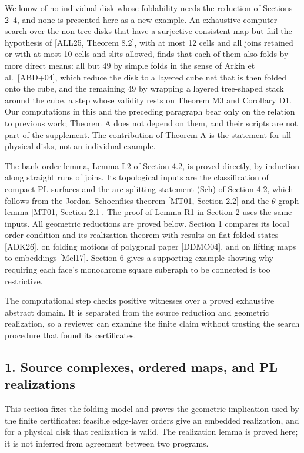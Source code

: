 \documentclass[
  11pt,
]{article}
\newcounter{none} %
\begin{document}
We know of no individual disk whose foldability needs the reduction of
Sections 2--4, and none is presented here as a new example. An
exhaustive computer search over the non-tree disks that have a
surjective consistent map but fail the hypothesis of {[}ALL25, Theorem
8.2{]}, with at most 12 cells and all joins retained or with at most 10
cells and slits allowed, finds that each of them also folds by more
direct means: all but 49 by simple folds in the sense of Arkin et
al.~{[}ABD+04{]}, which reduce the disk to a layered cube net that is
then folded onto the cube, and the remaining 49 by wrapping a layered
tree-shaped stack around the cube, a step whose validity rests on
Theorem M3 and Corollary D1. Our computations in this and the preceding
paragraph bear only on the relation to previous work; Theorem A does not
depend on them, and their scripts are not part of the supplement. The
contribution of Theorem A is the statement for all physical disks, not
an individual example.

The bank-order lemma, Lemma L2 of Section 4.2, is proved directly, by
induction along straight runs of joins. Its topological inputs are the
classification of compact PL surfaces and the arc-splitting statement
(Sch) of Section 4.2, which follows from the Jordan--Schoenflies theorem
{[}MT01, Section 2.2{]} and the \(\theta\)-graph lemma {[}MT01, Section
2.1{]}. The proof of Lemma R1 in Section 2 uses the same inputs. All
geometric reductions are proved below. Section 1 compares its local
order condition and its realization theorem with results on flat folded
states {[}ADK26{]}, on folding motions of polygonal paper {[}DDMO04{]},
and on lifting maps to embeddings {[}Mel17{]}. Section 6 gives a
supporting example showing why requiring each face's monochrome square
subgraph to be connected is too restrictive.

The computational step checks positive witnesses over a proved
exhaustive abstract domain. It is separated from the source reduction
and geometric realization, so a reviewer can examine the finite claim
without trusting the search procedure that found its certificates.

\subsection{1. Source complexes, ordered maps, and PL
realizations}\label{source-complexes-ordered-maps-and-pl-realizations}

This section fixes the folding model and proves the geometric
implication used by the finite certificates: feasible edge-layer orders
give an embedded realization, and for a physical disk that realization
is valid. The realization lemma is proved here; it is not inferred from
agreement between two programs.
\end{document}
